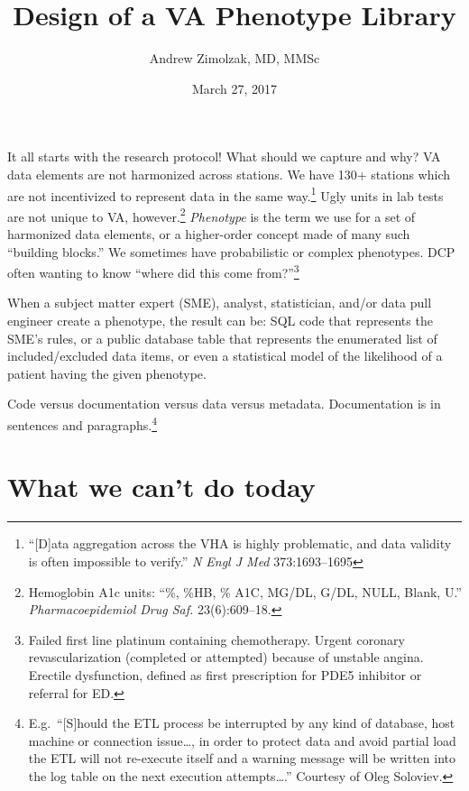 \documentclass{tufte-handout}
\title{Design of a VA Phenotype Library}
\author{Andrew Zimolzak, MD, MMSc}
\date{March 27, 2017}
\begin{document}
\maketitle

It all starts with the research protocol! What should we capture and
why? VA data elements are not harmonized across stations. We have 130+
stations which are not incentivized to represent data in the same
way.\footnote{``[D]ata aggregation across the VHA is highly
  problematic, and data validity is often impossible to verify.''
  \emph{N Engl J Med} 373:1693--1695} Ugly units in lab tests are not
unique to VA, however.\footnote{Hemoglobin A1c units: ``\%, \%HB, \%
  A1C, MG/DL, G/DL, NULL, Blank, U.'' \emph{Pharmacoepidemiol Drug
    Saf.} 23(6):609--18.} \emph{Phenotype} is the term we use for a
set of harmonized data elements, or a higher-order concept made of
many such ``building blocks.'' We sometimes have probabilistic or
complex phenotypes. DCP often wanting to know ``where did this come
from?''\footnote{Failed first line platinum containing chemotherapy.
  Urgent coronary revascularization (completed or attempted) because
  of unstable angina. Erectile dysfunction, defined as first
  prescription for PDE5 inhibitor or referral for ED.}

When a subject matter expert (SME), analyst, statistician, and/or data
pull engineer create a phenotype, the result can be: SQL code that
represents the SME's rules, or a public database table that represents
the enumerated list of included/excluded data items, or even a
statistical model of the likelihood of a patient having the given
phenotype. 

Code versus documentation versus data versus metadata. Documentation
is in sentences and paragraphs.\footnote{E.g.\ ``[S]hould the ETL
  process be interrupted by any kind of database, host machine or
  connection issue\ldots{}, in order to protect data and avoid partial
  load the ETL will not re-execute itself and a warning message will
  be written into the log table on the next execution
  attempts\ldots{}.'' Courtesy of Oleg Soloviev.}


\section{What we can't do today}
\end{document}
